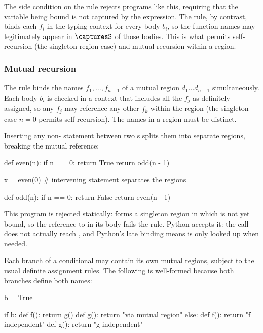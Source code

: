 \begin{PaperOnly}
\noindent The side condition on the  rule rejects programs like this, requiring that the
variable being bound is not captured by the expression. The  rule, by contrast, binds
each $f_i$ in the typing context for every body $b_i$, so the function names may legitimately appear in
$\capturesS$ of those bodies. This is what permits self-recursion (the singleton-region case) and
mutual recursion within a region.

\subsubsection{Mutual recursion}
\label{sec:mutual-recursion}

The  rule binds the names $f_1, \ldots, f_{n+1}$ of a mutual region $d_1 \ldots d_{n+1}$
simultaneously. Each body $b_i$ is checked in a context that includes all the $f_j$ as definitely
assigned, so any $f_j$ may reference any other $f_k$ within the region (the singleton case $n = 0$
permits self-recursion). The names in a region must be distinct.

Inserting any non- statement between two s splits them into separate regions,
breaking the mutual reference:

\begin{python}
def even(n):
    if n == 0:
        return True
    return odd(n - 1)

x = even(0)  # intervening statement separates the regions

def odd(n):
    if n == 0:
        return False
    return even(n - 1)
\end{python}

\noindent This program is rejected statically:  forms a singleton region in which
 is not yet bound, so the reference to  in its body fails the
 rule. Python accepts it: the call  does not actually reach
, and Python's late binding means  is only looked up when needed.

Each branch of a conditional may contain its own mutual regions, subject to the usual definite assignment
rules. The following is well-formed because both branches define both names:

\begin{python}
b = True

if b:
    def f():
        return g()
    def g():
        return "via mutual region"
else:
    def f():
        return "f independent"
    def g():
        return "g independent"


\end{python}
\end{PaperOnly}
